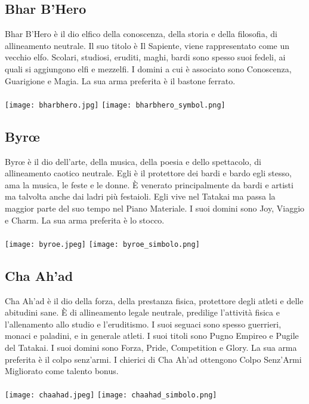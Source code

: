 \documentclass[a4paper]{report}
\begin{document}
\begin{multicols}{2}
\subsection*{Bhar B'Hero}
Bhar B'Hero è il dio elfico della conoscenza, della storia e della filosofia, di allineamento neutrale. Il suo titolo è Il Sapiente, viene rappresentato come un vecchio elfo. Scolari, studiosi, eruditi, maghi, bardi sono spesso suoi fedeli, ai quali si aggiungono elfi e mezzelfi. I domini a cui è associato sono Conoscenza, Guarigione e Magia. La sua arma preferita è il bastone ferrato.\\
\\
\texttt{[image: bharbhero.jpg]}
\texttt{[image: bharbhero\_symbol.png]}
\subsection*{Byrœ}
Byrœ è il dio dell'arte, della musica, della poesia e dello spettacolo, di allineamento caotico neutrale. Egli è il protettore dei bardi e bardo egli stesso, ama la musica, le feste e le donne. È venerato principalmente da bardi e artisti ma talvolta anche dai ladri più festaioli. Egli vive nel Tatakai ma passa la maggior parte del suo tempo nel Piano Materiale. I suoi domini sono Joy, Viaggio e Charm. La sua arma preferita è lo stocco.\\
\\
\texttt{[image: byroe.jpeg]}
\texttt{[image: byroe\_simbolo.png]}
\subsection*{Cha Ah'ad}
Cha Ah'ad è il dio della forza, della prestanza fisica, protettore degli atleti e delle abitudini sane. È di allineamento legale neutrale, predilige l'attività fisica e l'allenamento allo studio e l'eruditismo. I suoi seguaci sono spesso guerrieri, monaci e paladini, e in generale atleti. I suoi titoli sono Pugno Empireo e Pugile del Tatakai. I suoi domini sono Forza, Pride, Competition e Glory. La sua arma preferita è il colpo senz'armi. I chierici di Cha Ah'ad ottengono Colpo Senz'Armi Migliorato come talento bonus.\\
\\
\texttt{[image: chaahad.jpeg]}
\texttt{[image: chaahad\_simbolo.png]}

\end{multicols}
\end{document}
